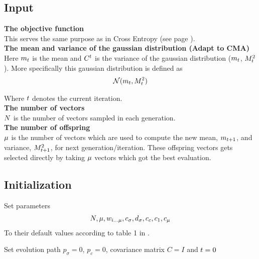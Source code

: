 
\subsection{Input}

\textbf{The objective function} \\
This serves the same purpose as in Cross Entropy (see page \pageref{CEObjective}).
\\

\textbf{The mean and variance of the gaussian distribution (Adapt to CMA)} \\
Here $m_{t}$ is the mean and  
$C^{t}$ is the variance 
of the gaussian distribution ($m_{t}$,
$M^2_{t}$). 
More specifically this gaussian distribution is defined as 
\begin{align*}
\mathcal{N}(m_{t},M^2_{t})
\end{align*}

Where $t$ denotes the current iteration.\\


\textbf{The number of vectors}\\
$N$ is the number of vectors sampled in each generation.
\\

\textbf{The number of offspring}\\
$\mu$ is the number of vectors which are used to compute 
the new mean, $m_{t + 1}$, and variance,
$M^2_{t + 1}$, for next generation/iteration. 
These offspring vectors gets selected 
directly by taking $\mu$ vectors
which got the best evaluation.
\\


\subsection{Initialization}


Set parameters
\begin{align*}
N, \mu, w_{i \dots \mu}, c_{\sigma}, d_{\sigma}, c_c, c_1, c_{\mu}
\end{align*}
To their default values according to table 1 in \citep{hansen2011}.

Set evolution path $p_{\sigma} = 0$, $p_{c} = 0$, covariance matrix $C = I$ and $t = 0$

